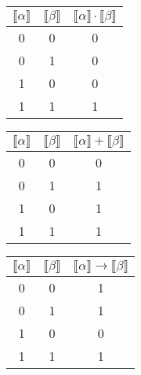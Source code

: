 \begin{enumerate}
          \begin{tabular}{c|c|c}
              \(\llbracket\alpha\rrbracket\) & \(\llbracket\beta\rrbracket\) & \(\llbracket\alpha\rrbracket \cdot \llbracket\beta\rrbracket\) \\ \hline
              0                              & 0                             & 0                                                              \\
              0                              & 1                             & 0                                                              \\
              1                              & 0                             & 0                                                              \\
              1                              & 1                             & 1                                                              \\
          \end{tabular}

          \begin{tabular}{c|c|c}
              \(\llbracket\alpha\rrbracket\) & \(\llbracket\beta\rrbracket\) & \(\llbracket\alpha\rrbracket + \llbracket\beta\rrbracket\) \\ \hline
              0                              & 0                             & 0                                                          \\
              0                              & 1                             & 1                                                          \\
              1                              & 0                             & 1                                                          \\
              1                              & 1                             & 1                                                          \\
          \end{tabular}

          \begin{tabular}{c|c|c}
              \(\llbracket\alpha\rrbracket\) & \(\llbracket\beta\rrbracket\) & \(\llbracket\alpha\rrbracket \to \llbracket\beta\rrbracket\) \\ \hline
              0                              & 0                             & 1                                                            \\
              0                              & 1                             & 1                                                            \\
              1                              & 0                             & 0                                                            \\
              1                              & 1                             & 1                                                            \\
          \end{tabular}


\end{enumerate}
